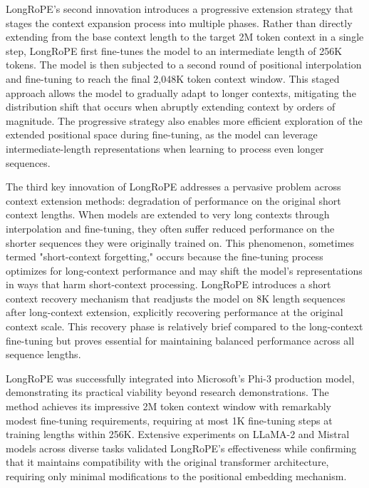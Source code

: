 \documentclass[11pt,letterpaper]{article}
\begin{document}
LongRoPE's second innovation introduces a progressive extension strategy that stages the context expansion process into multiple phases. Rather than directly extending from the base context length to the target 2M token context in a single step, LongRoPE first fine-tunes the model to an intermediate length of 256K tokens. The model is then subjected to a second round of positional interpolation and fine-tuning to reach the final 2,048K token context window. This staged approach allows the model to gradually adapt to longer contexts, mitigating the distribution shift that occurs when abruptly extending context by orders of magnitude. The progressive strategy also enables more efficient exploration of the extended positional space during fine-tuning, as the model can leverage intermediate-length representations when learning to process even longer sequences.

The third key innovation of LongRoPE addresses a pervasive problem across context extension methods: degradation of performance on the original short context lengths. When models are extended to very long contexts through interpolation and fine-tuning, they often suffer reduced performance on the shorter sequences they were originally trained on. This phenomenon, sometimes termed "short-context forgetting," occurs because the fine-tuning process optimizes for long-context performance and may shift the model's representations in ways that harm short-context processing. LongRoPE introduces a short context recovery mechanism that readjusts the model on 8K length sequences after long-context extension, explicitly recovering performance at the original context scale. This recovery phase is relatively brief compared to the long-context fine-tuning but proves essential for maintaining balanced performance across all sequence lengths.

LongRoPE was successfully integrated into Microsoft's Phi-3 production model, demonstrating its practical viability beyond research demonstrations. The method achieves its impressive 2M token context window with remarkably modest fine-tuning requirements, requiring at most 1K fine-tuning steps at training lengths within 256K. Extensive experiments on LLaMA-2 and Mistral models across diverse tasks validated LongRoPE's effectiveness while confirming that it maintains compatibility with the original transformer architecture, requiring only minimal modifications to the positional embedding mechanism.
\end{document}
